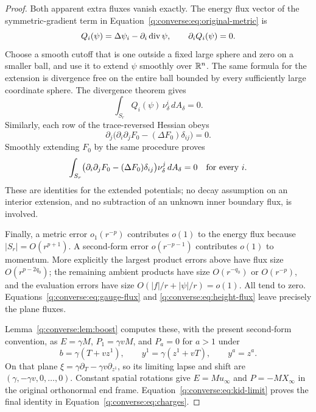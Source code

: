 \begin{proof}
Both apparent extra fluxes vanish exactly.  The energy flux vector
of the symmetric-gradient term in
Equation~\eqref{q:converse:eq:original-metric} is
\[
 Q_i(\psi)=\Delta\psi_i-\partial_i\operatorname{div}\psi,
 \qquad \partial_iQ_i(\psi)=0.
\]
Choose a smooth cutoff that is one outside a fixed large sphere and
zero on a smaller ball, and use it to extend $\psi$ smoothly over
$\mathbb R^n$.  The same formula for the extension is divergence free on
the entire ball bounded by every sufficiently large coordinate
sphere.  The divergence theorem gives
\begin{equation}
 \int_{S_r}Q_i(\psi)\,\nu_\delta^i\,dA_\delta=0.
 \label{q:converse:eq:gauge-flux}
\end{equation}
Similarly, each row of the trace-reversed Hessian obeys
\[
 \partial_j\bigl(\partial_i\partial_jF_0
             -(\Delta F_0)\delta_{ij}\bigr)=0.
\]
Smoothly extending $F_0$ by the same procedure proves
\begin{equation}
 \int_{S_r}\bigl(\partial_i\partial_jF_0
             -(\Delta F_0)\delta_{ij}\bigr)
              \nu_\delta^j\,dA_\delta=0
 \quad\hbox{for every }i.
 \label{q:converse:eq:height-flux}
\end{equation}
These are identities for the extended potentials; no decay assumption
on an interior extension, and no subtraction of an unknown inner
boundary flux, is involved.

Finally, a metric error $o_1(r^{-p})$ contributes $o(1)$ to the
energy flux because $|S_r|=O(r^{p+1})$.  A second-form error
$o(r^{-p-1})$ contributes $o(1)$ to momentum.  More explicitly the
largest product errors above have flux size $O(r^{p-2q_0})$; the
remaining ambient products have size $O(r^{-q_0})$ or $O(r^{-p})$,
and the evaluation errors have size
$O(|f|/r+|\psi|/r)=o(1)$.
All tend to zero.  Equations~\eqref{q:converse:eq:gauge-flux} and
\eqref{q:converse:eq:height-flux} leave precisely the plane fluxes.

Lemma~\ref{q:converse:lem:boost} computes these, with the present second-form
convention, as $E=\gamma M$, $P_1=\gamma vM$, and $P_a=0$ for $a>1$
under
\[
 b=\gamma(T+vz^1),\qquad
 y^1=\gamma(z^1+vT),\qquad y^a=z^a.
\]
On that plane $\xi=\gamma\partial_T-\gamma v\partial_{z^1}$, so its
limiting lapse and shift are $(\gamma,-\gamma v,0,\ldots,0)$.
Constant spatial rotations give
$E=Mu_\infty$ and $P=-MX_\infty$ in the original orthonormal end
frame.  Equation~\eqref{q:converse:eq:kid-limit} proves the final
identity in Equation~\eqref{q:converse:eq:charges}.
\end{proof}

